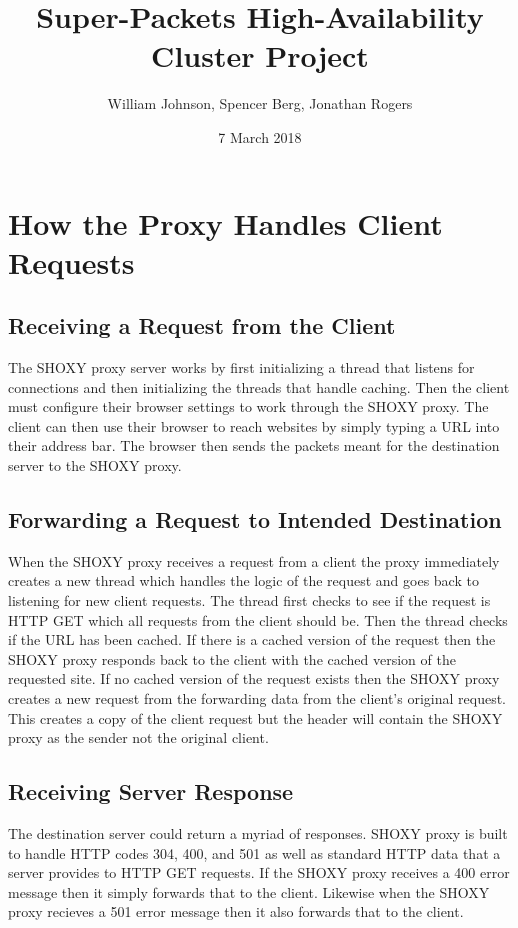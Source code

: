 \documentclass[11pt]{article}
\title{Super-Packets High-Availability Cluster Project}
\author{William Johnson, Spencer Berg,  Jonathan Rogers}
\date{7 March 2018}
\begin{document}
\maketitle

\thispagestyle{empty}

\begin{doublespace}



\end{doublespace}

\section{How the Proxy Handles Client Requests}
\subsection{Receiving a Request from the Client}
The SHOXY proxy server works by first initializing a thread that listens for connections and then initializing the threads that handle caching. Then the client must configure their browser settings to work through the SHOXY proxy. The client can then use their browser to reach websites by simply typing a URL into their address bar. The browser then sends the packets meant for the destination server to the SHOXY proxy. 

\subsection{Forwarding a Request to Intended Destination}
When the SHOXY proxy receives a request from a client the proxy immediately creates a new thread which handles the logic of the request and goes back to listening for new client requests. The thread first checks to see if the request is HTTP GET which all requests from the client should be. Then the thread checks if the URL has been cached. If there is a cached version of the request then the SHOXY proxy responds back to the client with the cached version of the requested site. If no cached version of the request exists then the SHOXY proxy creates a new request from the forwarding data from the client's original request. This creates a copy of the client request but the header will contain the SHOXY proxy as the sender not the original client. 

\subsection{Receiving Server Response}
The destination server could return a myriad of responses. SHOXY proxy is built to handle HTTP codes 304, 400, and 501 as well as standard HTTP data that a server provides to HTTP GET requests. If the SHOXY proxy receives a 400 error message then it simply forwards that to the client. Likewise when the SHOXY proxy recieves a 501 error message then it also forwards that to the client. 
\end{document}
